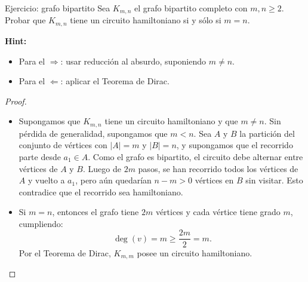 \begin{exampleblock}{Ejercicio: grafo bipartito}
Sea \( K_{m,n} \) el grafo bipartito completo con \( m,n \geq 2 \).  
Probar que \( K_{m,n} \) tiene un circuito hamiltoniano si y sólo si \( m = n \).

\textbf{Hint:}
\begin{itemize}
  \item Para el \( \Rightarrow \): usar reducción al absurdo, suponiendo \( m \neq n \).
  \item Para el \( \Leftarrow \): aplicar el Teorema de Dirac.
\end{itemize}
\end{exampleblock}

\begin{proof}
\leavevmode
\begin{itemize}
\item[$\Rightarrow$]
Supongamos que \( K_{m,n} \) tiene un circuito hamiltoniano y que \( m \neq n \).  
Sin pérdida de generalidad, supongamos que \( m < n \). Sea \( A \) y \( B \) la partición del conjunto de vértices con \( |A| = m \) y \( |B| = n \), y supongamos que el recorrido parte desde \( a_1 \in A \).  
Como el grafo es bipartito, el circuito debe alternar entre vértices de \( A \) y \( B \).  
Luego de \( 2m \) pasos, se han recorrido todos los vértices de \( A \) y vuelto a \( a_1 \), pero aún quedarían \( n - m > 0 \) vértices en \( B \) sin visitar.  
Esto contradice que el recorrido sea hamiltoniano.

\item[$\Leftarrow$]
Si \( m = n \), entonces el grafo tiene \( 2m \) vértices y cada vértice tiene grado \( m \), cumpliendo:
\[
\deg(v) = m \geq \frac{2m}{2} = m.
\]
Por el Teorema de Dirac, \( K_{m,m} \) posee un circuito hamiltoniano.
\end{itemize}
\end{proof}